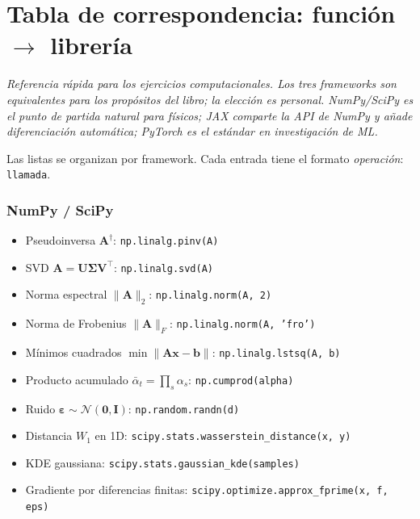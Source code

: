 \section{Tabla de correspondencia: función $\to$ librería}
\label{sec:ap_librerias}

\textit{Referencia rápida para los ejercicios computacionales. Los tres
frameworks son equivalentes para los propósitos del libro; la elección es
personal. NumPy/SciPy es el punto de partida natural para físicos; JAX
comparte la API de NumPy y añade diferenciación automática; PyTorch es el
estándar en investigación de ML.}

\medskip
Las listas se organizan por framework. Cada entrada tiene el formato
\emph{operación}: \texttt{llamada}.

\subsubsection*{NumPy / SciPy}
\begin{itemize}[leftmargin=*, nosep]
  \item Pseudoinversa $\bm{A}^\dagger$:
        \texttt{np.linalg.pinv(A)}
  \item SVD $\bm{A}=\bm{U}\bm{\Sigma}\bm{V}^\top$:
        \texttt{np.linalg.svd(A)}
  \item Norma espectral $\|\bm{A}\|_2$:
        \texttt{np.linalg.norm(A, 2)}
  \item Norma de Frobenius $\|\bm{A}\|_F$:
        \texttt{np.linalg.norm(A, 'fro')}
  \item Mínimos cuadrados $\min\|\bm{A}\bm{x}-\bm{b}\|$:
        \texttt{np.linalg.lstsq(A, b)}
  \item Producto acumulado $\bar\alpha_t = \prod_s\alpha_s$:
        \texttt{np.cumprod(alpha)}
  \item Ruido $\bm{\varepsilon}\sim\mathcal{N}(\bm{0},\bm{I})$:
        \texttt{np.random.randn(d)}
  \item Distancia $W_1$ en 1D:
        \texttt{scipy.stats.wasserstein\_distance(x, y)}
  \item KDE gaussiana:
        \texttt{scipy.stats.gaussian\_kde(samples)}
  \item Gradiente por diferencias finitas:
        \texttt{scipy.optimize.approx\_fprime(x, f, eps)}
\end{itemize}


